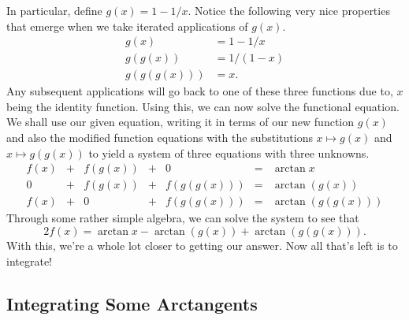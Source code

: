 In particular, define \( g \left( x \right) = 1 - 1 / x \). Notice the
following very nice properties that emerge when we take iterated applications
of \( g \left( x \right) \).
\begin{align*}
    g \left( x \right) &= 1 - 1/x \\
    g \left( g \left( x \right) \right) &= 1 / \left( 1 - x \right) \\
    g \left( g \left( g \left( x \right) \right) \right) &= x
.\end{align*}
Any subsequent applications will go back to one of these three functions due
to, \( x \) being the identity function. Using this, we can now solve the
functional equation. We shall use our given equation, writing it in terms of
our new function \( g \left( x \right) \) and also the modified function
equations with the substitutions \( x \mapsto g \left( x \right) \) and \( x
\mapsto g \left( g \left( x \right) \right) \) to yield a system of three
equations with three unknowns.
\[
\begin{array}{ccccccl}
    f \left( x \right) & + & f \left( g \left( x \right) \right) & + & 0 & = & \arctan{x} \\
    0 & + &  f \left( g \left( x \right) \right) & + & f \left( g \left( g \left( x \right) \right) \right) & = & \arctan{\left( g \left( x \right) \right)} \\
    f \left( x \right) & + & 0 & + & f \left( g \left( g \left( x \right) \right) \right) & = & \arctan{\left( g \left( g \left( x \right) \right) \right)}
\end{array}
\]
Through some rather simple algebra, we can solve the system to see that
\[
    2 f \left( x \right) = \arctan{x} - \arctan{\left( g \left( x \right) \right)} + \arctan{\left( g \left( g \left( x \right) \right) \right)}
.\]
With this, we're a whole lot closer to getting our answer. Now all that's left is to integrate!

\subsection{Integrating Some Arctangents}

